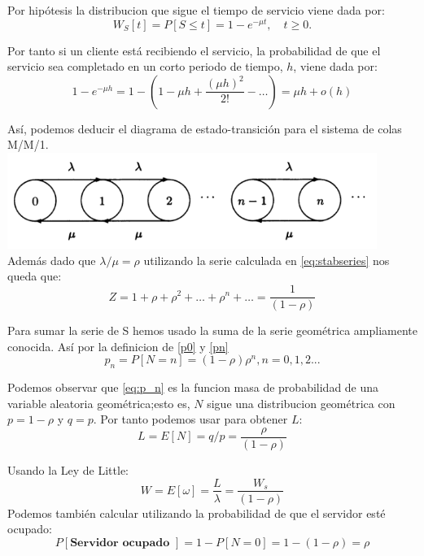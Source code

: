 \documentclass[8pt]{beamer}
\begin{document}
\begin{frame}
	Por hipótesis la distribucion que sigue el tiempo de servicio viene dada por:
	\begin{equation*}
	W_S[t] = P[S\leq t] = 1-e^{-\mu t}, \quad t\ge 0.
	\end{equation*}
	
	Por tanto si un cliente está recibiendo el servicio, la probabilidad de que el servicio sea completado en un corto periodo de tiempo, $h$, viene dada por:
	\begin{equation*}
	1-e^{-\mu h} = 1 - \left(1-\mu h+\frac{(\mu h)^2}{2!}- \dots\right)=\mu h +o(h)
	\end{equation*}
\end{frame}
\begin{frame}
	Así, podemos deducir el diagrama de estado-transición para el sistema de colas M/M/1. 
	\includegraphics[width=0.9\textwidth]{./imgs/diagrama.png}
	Además dado que $\lambda/\mu=\rho$ utilizando la serie calculada en \ref{eq:stabseries} nos queda que:
	\begin{equation*}
	Z=1+\rho+\rho^2+\dots+\rho^n+\dots=\frac{1}{(1-\rho)}
	\end{equation*}
\end{frame}
\begin{frame}
	Para sumar la serie de S hemos usado la suma de la serie geométrica ampliamente conocida.
	Así por la definicion de \ref{p0} y \ref{pn}
	\begin{equation}
	p_n=P[N=n]=(1-\rho)\rho^n, n=0,1,2...
	\label{eq:p_n}
	\end{equation}
\end{frame}
\begin{frame}
	Podemos observar que \ref{eq:p_n} es la funcion masa de probabilidad de una variable aleatoria geométrica;esto
	es, $N$ sigue una distribucion geométrica con $p=1-\rho$ y $q=p$. Por tanto podemos usar para obtener $L$:
	\begin{equation*}
	L=E[N]=q/p=\frac{\rho}{(1-\rho)}
	\end{equation*}
	
	Usando la Ley de Little:
	\begin{equation*}
	W=E[\omega]=\frac{L}{\lambda}=\frac{W_s}{(1-\rho)}
	\end{equation*}
	Podemos también calcular utilizando la probabilidad de que el servidor esté ocupado:
	\begin{equation*}
	P[\textbf{Servidor ocupado }]=1-P[N=0]=1-(1-\rho)=\rho
	\end{equation*}
\end{frame}
\end{document}
